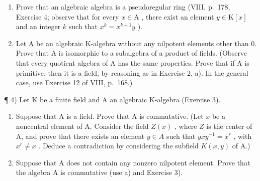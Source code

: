 \begin{enumerate}
\def\labelenumi{\alph{enumi})}
\item
  Prove that an algebraic algebra is a pseudoregular ring (VIII, p.~178, Exercise 4; observe that for every \(x \in \mathrm{A}\) , there exist an element \(y \in \mathrm{K}[x]\) and an integer \(k\) such that \(x^k = x^{k+1}y\) ).
\item
  Let A be an algebraic K-algebra without any nilpotent elements other than 0. Prove that A is isomorphic to a subalgebra of a product of fields. (Observe that every quotient algebra of A has the same properties. Prove that if A is primitive, then it is a field, by reasoning as in Exercise 2, a). In the general case, use Exercise 12 of VIII, p.~168.)
\end{enumerate}

¶ 4) Let K be a finite field and A an algebraic K-algebra (Exercise 3).

\begin{enumerate}
\def\labelenumi{\alph{enumi})}
\item
  Suppose that A is a field. Prove that A is commutative. (Let \(x\) be a noncentral element of A. Consider the field \(Z(x)\) , where \(Z\) is the center of A, and prove that there exists an element \(y \in A\) such that \(yxy^{-1} = x^r\) , with \(x^r \neq x\) . Deduce a contradiction by considering the subfield \(K(x,y)\) of A.)
\item
  Suppose that A does not contain any nonzero nilpotent element. Prove that the algebra A is commutative (use a) and Exercise 3).
\end{enumerate}

